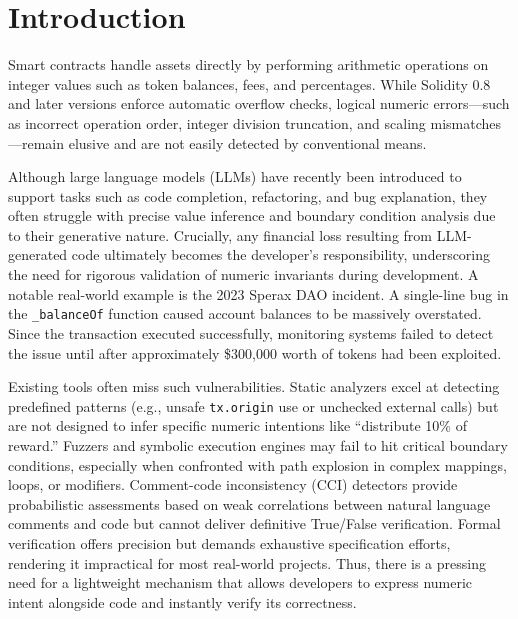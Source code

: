 \documentclass[pdflatex,sn-basic]{sn-jnl}%
\theoremstyle{thmstyleone}%
\theoremstyle{thmstyletwo}%
\theoremstyle{thmstylethree}%
\begin{document}
\section{Introduction}

Smart contracts handle assets directly by performing arithmetic operations on integer values such as token balances, fees, and percentages.  
While Solidity 0.8 and later versions enforce automatic overflow checks, logical numeric errors—such as incorrect operation order, integer division truncation, and scaling mismatches—remain elusive and are not easily detected by conventional means.

Although large language models (LLMs) have recently been introduced to support tasks such as code completion, refactoring, and bug explanation, they often struggle with precise value inference and boundary condition analysis due to their generative nature.  
Crucially, any financial loss resulting from LLM-generated code ultimately becomes the developer’s responsibility, underscoring the need for rigorous validation of numeric invariants during development.  
A notable real-world example is the 2023 Sperax DAO incident.  
A single-line bug in the \texttt{\_balanceOf} function caused account balances to be massively overstated.  
Since the transaction executed successfully, monitoring systems failed to detect the issue until after approximately \$300,000 worth of tokens had been exploited.

Existing tools often miss such vulnerabilities.  
Static analyzers excel at detecting predefined patterns (e.g., unsafe \texttt{tx.origin} use or unchecked external calls) but are not designed to infer specific numeric intentions like “distribute 10\% of reward.”  
Fuzzers and symbolic execution engines may fail to hit critical boundary conditions, especially when confronted with path explosion in complex mappings, loops, or modifiers.  
Comment-code inconsistency (CCI) detectors provide probabilistic assessments based on weak correlations between natural language comments and code but cannot deliver definitive True/False verification.  
Formal verification offers precision but demands exhaustive specification efforts, rendering it impractical for most real-world projects.  
Thus, there is a pressing need for a lightweight mechanism that allows developers to express numeric intent alongside code and instantly verify its correctness.
\end{document}
